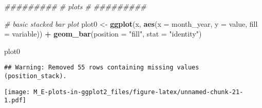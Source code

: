 \documentclass[]{article}
\newenvironment{Shaded}{\begin{snugshade}}{\end{snugshade}}
\newcommand{\CommentTok}[1]{\textcolor[rgb]{0.56,0.35,0.01}{\textit{#1}}}
\newcommand{\DataTypeTok}[1]{\textcolor[rgb]{0.13,0.29,0.53}{#1}}
\newcommand{\KeywordTok}[1]{\textcolor[rgb]{0.13,0.29,0.53}{\textbf{#1}}}
\newcommand{\NormalTok}[1]{#1}
\newcommand{\OperatorTok}[1]{\textcolor[rgb]{0.81,0.36,0.00}{\textbf{#1}}}
\newcommand{\StringTok}[1]{\textcolor[rgb]{0.31,0.60,0.02}{#1}}
\begin{document}
\begin{Shaded}
\end{Shaded}

\begin{Shaded}
\begin{Highlighting}[]
\CommentTok{#########}
\CommentTok{# plots #}
\CommentTok{#########}


\CommentTok{# basic stacked bar plot}
\NormalTok{plot0 <-}
\StringTok{  }\KeywordTok{ggplot}\NormalTok{(x, }\KeywordTok{aes}\NormalTok{(}\DataTypeTok{x =}\NormalTok{ month_year, }\DataTypeTok{y =}\NormalTok{ value, }\DataTypeTok{fill =}\NormalTok{ variable)) }\OperatorTok{+}
\StringTok{  }\KeywordTok{geom_bar}\NormalTok{(}\DataTypeTok{position =} \StringTok{"fill"}\NormalTok{, }\DataTypeTok{stat =} \StringTok{"identity"}\NormalTok{)}

\NormalTok{plot0}
\end{Highlighting}
\end{Shaded}

\begin{verbatim}
## Warning: Removed 55 rows containing missing values (position_stack).
\end{verbatim}

\texttt{[image: M\_E-plots-in-ggplot2\_files/figure-latex/unnamed-chunk-21-1.pdf]}
\end{document}
